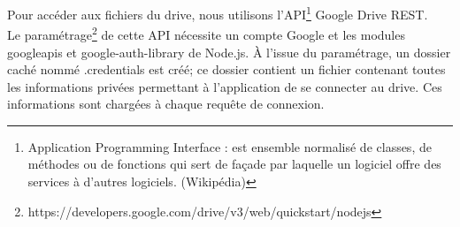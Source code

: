 \par
Pour accéder aux fichiers du drive, nous utilisons l'API\footnote{Application Programming Interface : est ensemble normalisé de classes, de méthodes ou de fonctions qui sert de façade par laquelle un logiciel offre des services à d'autres logiciels. (Wikipédia)} Google Drive REST.\\
Le paramétrage\footnote{https://developers.google.com/drive/v3/web/quickstart/nodejs} de cette API nécessite un compte Google et les modules googleapis et google-auth-library de Node.js. À l'issue du paramétrage, un dossier caché nommé .credentials est créé; ce dossier contient un fichier contenant toutes les informations privées permettant à l'application de se connecter au drive. Ces informations sont chargées à chaque requête de connexion.